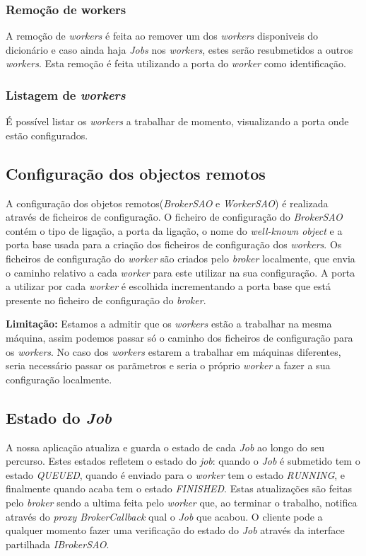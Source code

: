\documentclass[a4paper]{article}
\begin{document}
\subsubsection{Remoção de workers}
A remoção de \emph{workers} é feita ao remover um dos \emph{workers} disponiveis do dicionário e caso ainda haja \emph{Jobs} nos \emph{workers}, estes serão resubmetidos a outros \emph{workers}.
Esta remoção é feita utilizando a porta do \emph{worker} como identificação.

\subsubsection{Listagem de \emph{workers}}
É possível listar os \emph{workers} a trabalhar de momento, visualizando a porta onde estão configurados.

\subsection{Configuração dos objectos remotos}
A configuração dos objetos remotos(\emph{BrokerSAO} e \emph{WorkerSAO}) é realizada através de ficheiros de configuração. O ficheiro de configuração do \emph{BrokerSAO} contém o tipo de ligação, a porta da ligação, o nome do \emph{well-known object} e a porta base usada para a criação dos ficheiros de configuração dos \emph{workers}.
Os ficheiros de configuração do \emph{worker} são criados pelo \emph{broker} localmente, que envia o caminho relativo a cada \emph{worker} para este utilizar na sua configuração. A porta a utilizar por cada \emph{worker} é escolhida incrementando a porta base que está presente no ficheiro de configuração do \emph{broker}.


\textbf{Limitação:} Estamos a admitir que os \emph{workers} estão a trabalhar na mesma máquina, assim podemos passar só o caminho dos ficheiros de configuração para os \emph{workers}. No caso dos \emph{workers} estarem a trabalhar em máquinas diferentes, seria necessário passar os parãmetros e seria o próprio \emph{worker} a fazer a sua configuração localmente.


\subsection{Estado do \emph{Job}}
A nossa aplicação atualiza e guarda o estado de cada \emph{Job} ao longo do seu percurso. Estes estados refletem o estado do \emph{job}: quando o \emph{Job} é submetido tem o estado \emph{QUEUED}, quando é enviado para o \emph{worker} tem o estado \emph{RUNNING}, e finalmente quando acaba tem o estado \emph{FINISHED}. 
Estas atualizações são feitas pelo \emph{broker} sendo a ultima feita pelo \emph{worker} que, ao terminar o trabalho, notifica através do \emph{proxy BrokerCallback} qual o \emph{Job} que acabou.
O cliente pode a qualquer momento fazer uma verificação do estado do \emph{Job} através da interface partilhada \emph{IBrokerSAO}.
\end{document}

